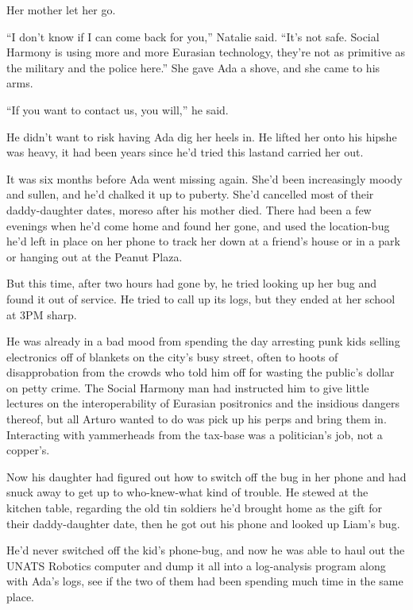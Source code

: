 Her mother let her go.

“I don’t know if I can come back for you,” Natalie said. “It’s not
safe. Social Harmony is using more and more Eurasian technology,
they’re not as primitive as the military and the police here.” She
gave Ada a shove, and she came to his arms.

“If you want to contact us, you will,” he said.

He didn’t want to risk having Ada dig her heels in. He lifted her
onto his hip{\dash}she was heavy, it had been years since he’d tried this
last{\dash}and carried her out.

\tb

It was six months before Ada went missing again. She’d been
increasingly moody and sullen, and he’d chalked it up to puberty.
She’d cancelled most of their daddy-daughter dates, moreso after
his mother died. There had been a few evenings when he’d come home
and found her gone, and used the location-bug he’d left in place on
her phone to track her down at a friend’s house or in a park or
hanging out at the Peanut Plaza.

But this time, after two hours had gone by, he tried looking up her
bug and found it out of service. He tried to call up its logs, but
they ended at her school at 3PM sharp.

He was already in a bad mood from spending the day arresting punk
kids selling electronics off of blankets on the city’s busy street,
often to hoots of disapprobation from the crowds who told him off
for wasting the public’s dollar on petty crime. The Social Harmony
man had instructed him to give little lectures on the
interoperability of Eurasian positronics and the insidious dangers
thereof, but all Arturo wanted to do was pick up his perps and
bring them in. Interacting with yammerheads from the tax-base was a
politician’s job, not a copper’s.

Now his daughter had figured out how to switch off the bug in her
phone and had snuck away to get up to who-knew-what kind of
trouble. He stewed at the kitchen table, regarding the old tin
soldiers he’d brought home as the gift for their daddy-daughter
date, then he got out his phone and looked up Liam’s bug.

He’d never switched off the kid’s phone-bug, and now he was able to
haul out the UNATS Robotics computer and dump it all into a
log-analysis program along with Ada’s logs, see if the two of them
had been spending much time in the same place.

